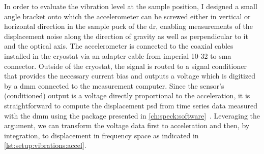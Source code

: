 In order to evaluate the vibration level at the sample position, I designed a small angle bracket onto which the accelerometer
can be screwed either in vertical or horizontal direction in the sample puck of the \gls{dr}, enabling measurements of the displacement noise along the direction of gravity as well as perpendicular to it and the optical axis.
The accelerometer is connected to the coaxial cables installed in the cryostat via an adapter cable from imperial 10-32 to \acrshort{sma} connector.
Outside of the cryostat, the signal is routed to a signal conditioner that provides the necessary current bias and outputs a voltage which is digitized by a \thedmm \gls{dmm} connected to the measurement computer.
Since the sensor's (conditioned) output is a voltage directly proportional to the acceleration, it is straightforward to compute the displacement \gls{psd} from time series data measured with the \gls{dmm} using the \pyspeck package presented in \cref{ch:speck:software}~\cite{Hangleiter_pyspeck}.
Leveraging the  argument, we can transform the voltage data first to acceleration and then, by integration, to displacement in frequency space as indicated in \cref{lst:setup:vibrations:accel}.

